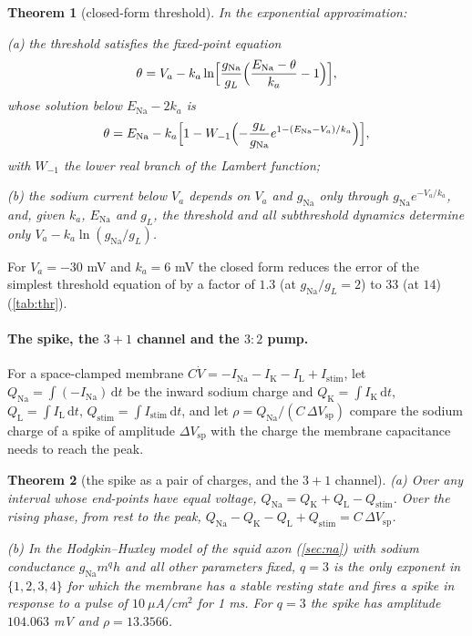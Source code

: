 \documentclass[11pt]{article}
\newtheorem{theorem}{Theorem}
\theoremstyle{definition}\newtheorem{definition}[theorem]{Definition}
\theoremstyle{remark}\newtheorem{remark}[theorem]{Remark}
\begin{document}
\begin{theorem}[closed-form threshold]\label{thm:thr}
In the exponential approximation:
\par\noindent(a) the threshold satisfies the fixed-point equation
\[
\theta=V_a-k_a\ln\Bigl[\frac{g_\mathrm{Na}}{g_L}\Bigl(\frac{E_\mathrm{Na}-\theta}{k_a}-1\Bigr)\Bigr],
\]
whose solution below $E_{\mathrm{Na}}-2k_a$ is
\[
\theta=E_\mathrm{Na}-k_a\Bigl[1-W_{-1}\Bigl(-\frac{g_L}{g_\mathrm{Na}}e^{1-(E_\mathrm{Na}-V_a)/k_a}\Bigr)\Bigr],
\]
with $W_{-1}$ the lower real branch of the Lambert function;
\par\noindent(b) the sodium current below $V_a$ depends on $V_a$ and $g_\mathrm{Na}$ only through $g_\mathrm{Na}e^{-V_a/k_a}$, and, given $k_a$, $E_\mathrm{Na}$ and $g_L$, the threshold and all subthreshold dynamics determine only $V_a-k_a\ln(g_\mathrm{Na}/g_L)$.
\end{theorem}

For $V_a=-30$ mV and $k_a=6$ mV the closed form reduces the error of the simplest threshold equation of \cite{PB} by a factor of $1.3$ (at $g_\mathrm{Na}/g_L=2$) to $33$ (at $14$) (\cref{tab:thr}).

\paragraph{The spike, the $3+1$ channel and the $3{:}2$ pump.} For a space-clamped membrane $C\dot V=-I_{\mathrm{Na}}-I_{\mathrm{K}}-I_{\mathrm{L}}+I_{\mathrm{stim}}$, let $Q_{\mathrm{Na}}=\int(-I_{\mathrm{Na}})\,\mathrm dt$ be the inward sodium charge and $Q_{\mathrm{K}}=\int I_{\mathrm{K}}\,\mathrm dt$, $Q_{\mathrm{L}}=\int I_{\mathrm{L}}\,\mathrm dt$, $Q_{\mathrm{stim}}=\int I_{\mathrm{stim}}\,\mathrm dt$, and let $\rho=Q_{\mathrm{Na}}/(C\,\Delta V_{\mathrm{sp}})$ compare the sodium charge of a spike of amplitude $\Delta V_{\mathrm{sp}}$ with the charge the membrane capacitance needs to reach the peak.

\begin{theorem}[the spike as a pair of charges, and the $3+1$ channel]\label{thm:charge}
(a) Over any interval whose end-points have equal voltage, $Q_{\mathrm{Na}}=Q_{\mathrm{K}}+Q_{\mathrm{L}}-Q_{\mathrm{stim}}$. Over the rising phase, from rest to the peak, $Q_{\mathrm{Na}}-Q_{\mathrm{K}}-Q_{\mathrm{L}}+Q_{\mathrm{stim}}=C\,\Delta V_{\mathrm{sp}}$.
\par\noindent(b) In the Hodgkin--Huxley model of the squid axon (\cref{sec:na}) with sodium conductance $g_{\mathrm{Na}}m^qh$ and all other parameters fixed, $q=3$ is the only exponent in $\{1,2,3,4\}$ for which the membrane has a stable resting state and fires a spike in response to a pulse of $10\ \mu$A/cm$^2$ for 1 ms. For $q=3$ the spike has amplitude $104.063$ mV and $\rho=13.3566$.
\end{theorem}
\end{document}
